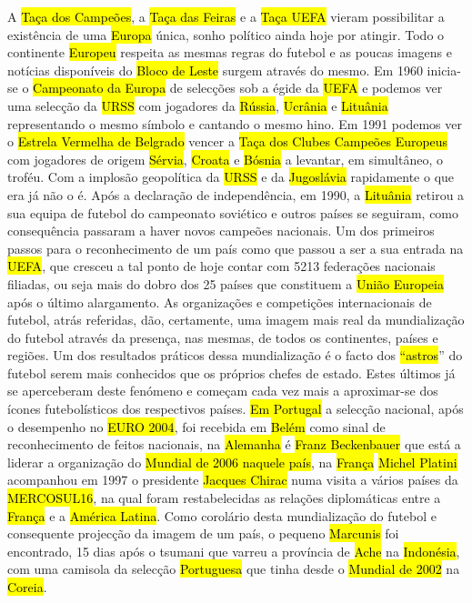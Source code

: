 \documentclass[a4paper,12pt]{article}
\begin{document}
 A \hl{Taça dos Campeões}, a \hl{Taça das Feiras} e a \hl{Taça UEFA} vieram possibilitar a existência de uma \hl{Europa} única, sonho político ainda hoje por atingir. Todo o continente \hl{Europeu} respeita as mesmas regras do futebol e as poucas imagens e notícias disponíveis do \hl{Bloco de Leste} surgem através do mesmo.
 Em 1960 inicia-se o \hl{Campeonato da Europa} de selecções sob a égide da \hl{UEFA} e podemos ver uma selecção da \hl{URSS} com jogadores da \hl{Rússia}, \hl{Ucrânia} e \hl{Lituânia} representando o
 mesmo símbolo e cantando o mesmo hino. Em 1991 podemos ver o \hl{Estrela Vermelha de Belgrado} vencer a \hl{Taça dos Clubes Campeões Europeus} com jogadores de origem \hl{Sérvia}, \hl{Croata} e \hl{Bósnia} a levantar, em simultâneo, o troféu.
 Com a implosão geopolítica da \hl{URSS} e da \hl{Jugoslávia} rapidamente o que era já não o é.
Após a declaração de independência, em 1990, a \hl{Lituânia} retirou a sua equipa de futebol do campeonato soviético e outros países se seguiram, como consequência passaram a haver novos campeões nacionais. Um dos primeiros passos para o reconhecimento de um país como que passou a ser a sua entrada na \hl{UEFA}, que cresceu a tal ponto de hoje contar com 5213 federações nacionais filiadas, ou seja mais do dobro dos 25 países que constituem a \hl{União Europeia} após o último alargamento.
 As organizações e competições internacionais de futebol, atrás referidas, dão, certamente, uma imagem mais real da mundialização do futebol através da presença, nas mesmas, de todos os continentes, países e regiões. Um dos resultados práticos dessa mundialização é o facto dos \hl{“astros}” do futebol serem mais conhecidos que os próprios chefes de estado. Estes últimos já se aperceberam deste fenómeno e começam cada vez mais a aproximar-se dos ícones futebolísticos dos respectivos países. \hl{Em Portugal} a selecção nacional, após o desempenho no \hl{EURO 2004}, foi recebida em \hl{Belém} como sinal de reconhecimento de feitos nacionais, na \hl{Alemanha} é \hl{Franz Beckenbauer} que está a liderar a organização do \hl{Mundial de 2006 naquele país}, na \hl{França} \hl{Michel Platini} acompanhou em 1997 o presidente \hl{Jacques Chirac} numa visita a vários países da \hl{MERCOSUL16}, na qual foram restabelecidas as relações diplomáticas entre a \hl{França} e a \hl{América Latina}.
 Como corolário desta mundialização do futebol e consequente projecção da imagem de um país, o pequeno \hl{Marcunis} foi encontrado, 15 dias após o tsumani que varreu a província de \hl{Ache} na \hl{Indonésia}, com uma camisola da selecção \hl{Portuguesa} que tinha desde o \hl{Mundial de 2002} na \hl{Coreia}.
\end{document}
